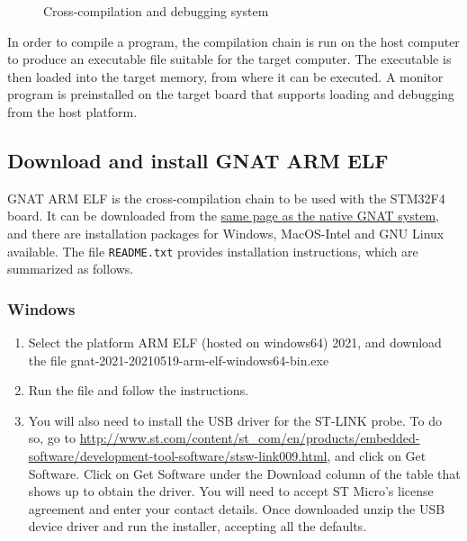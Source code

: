 \begin{figure}[hbtp!]
    \caption{Cross-compilation and debugging system}
    \label{fig:cross}
\end{figure}

In order to compile a program, the compilation chain is run on the host computer to produce an executable file suitable for the target computer.
The executable is then loaded into the target memory,
from where it can be executed.
A monitor program is preinstalled on the target board
that supports loading and debugging from the host platform.

\subsection{Download and install GNAT ARM ELF}

GNAT ARM ELF is the cross-compilation chain to be used with the STM32F4 board. It can be downloaded from the
\href{https://www.adacore.com/download/more}{same page as the native GNAT system},
and there are installation packages for Windows, MacOS-Intel and GNU Linux available.
The file \texttt{README.txt} provides installation instructions,
which are summarized as follows.

\subsubsection*{Windows}
\begin{enumerate}
\item Select the platform ARM ELF (hosted on windows64) 2021, and download the file
gnat-2021-20210519-arm-elf-windows64-bin.exe
\item Run the file and follow the instructions.
\item You will also need to install the USB driver for the ST-LINK probe. To do so, go to \url{http://www.st.com/content/st\_com/en/products/embedded-software/development-tool-software/stsw-link009.html}, and click on Get Software. Click on Get Software under the Download column of the table that shows up to obtain the driver. You will need to accept ST Micro’s license agreement and enter your contact details. 
Once downloaded unzip the USB device driver and run the installer, accepting all the defaults.
\end{enumerate}
